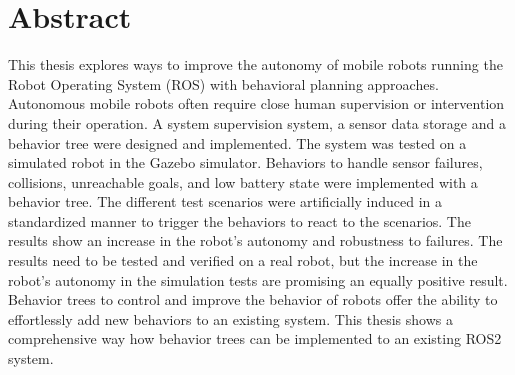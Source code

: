 \chapter*{Abstract}

This thesis explores ways to improve the autonomy of mobile robots running the Robot Operating System (ROS) with behavioral planning approaches. Autonomous mobile robots often require close human supervision or intervention during their operation. A system supervision system, a sensor data storage and a behavior tree were designed and implemented. The system was tested on a simulated robot in the Gazebo simulator. Behaviors to handle sensor failures, collisions, unreachable goals, and low battery state were implemented with a behavior tree. The different test scenarios were artificially induced in a standardized manner to trigger the behaviors to react to the scenarios. The results show an increase in the robot's autonomy and robustness to failures. The results need to be tested and verified on a real robot, but the increase in the robot's autonomy in the simulation tests are promising an equally positive result. Behavior trees to control and improve the behavior of robots offer the ability to effortlessly add new behaviors to an existing system. This thesis shows a comprehensive way how behavior trees can be implemented to an existing ROS2 system.
